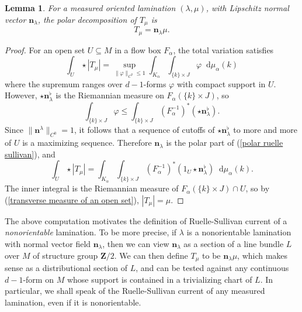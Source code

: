 \documentclass[reqno,11pt]{amsart}
\newcommand{\ZZ}{\mathbf{Z}}
\newcommand*\dif{\mathop{}\!\mathrm{d}}
\newcommand{\normal}{\mathbf n}
\newtheorem{lemma}[theorem]{Lemma}
\theoremstyle{definition}
\numberwithin{equation}{section}
\begin{document}
\begin{lemma}
For a measured oriented lamination $(\lambda, \mu)$, with Lipschitz normal vector $\normal_\lambda$, the polar decomposition of $T_\mu$ is
\begin{equation}\label{polar ruelle sullivan}
T_\mu = \normal_\lambda \mu.
\end{equation}
\end{lemma}
\begin{proof}
For an open set $U \subseteq M$ in a flow box $F_\alpha$, the total variation satisfies
$$\int_U \star |T_\mu| = \sup_{\|\varphi\|_{C^0} \leq 1} \int_{K_\alpha} \int_{\{k\} \times J} \varphi \dif \mu_\alpha(k)$$
where the supremum ranges over $d-1$-forms $\varphi$ with compact support in $U$.
However, $\star \normal_\lambda^\flat$ is the Riemannian measure on $F_\alpha(\{k\} \times J)$, so
$$\int_{\{k\} \times J} \varphi \leq \int_{\{k\} \times J} (F_\alpha^{-1})^*(\star \normal_\lambda^\flat).$$
Since $\|\normal^\lambda\|_{C^0} = 1$, it follows that a sequence of cutoffs of $\star \normal_\lambda^\flat$ to more and more of $U$ is a maximizing sequence.
Therefore $\normal_\lambda$ is the polar part of (\ref{polar ruelle sullivan}), and
$$\int_U \star |T_\mu| = \int_{K_\alpha} \int_{\{k\} \times J} (F_\alpha^{-1})^*(1_U \star \normal_\lambda^\flat) \dif \mu_\alpha(k).$$
The inner integral is the Riemannian measure of $F_\alpha(\{k\} \times J) \cap U$, so by (\ref{transverse measure of an open set}), $|T_\mu| = \mu$.
\end{proof}

The above computation motivates the definition of Ruelle-Sullivan current of a \emph{nonorientable} lamination.
To be more precise, if $\lambda$ is a nonorientable lamination with normal vector field $\normal_\lambda$, then we can view $\normal_\lambda$ as a section of a line bundle $L$ over $M$ of structure group $\ZZ/2$.
We can then define $T_\mu$ to be $\normal_\lambda \mu$, which makes sense as a distributional section of $L$, and can be tested against any continuous $d-1$-form on $M$ whose support is contained in a trivializing chart of $L$.
In particular, we shall speak of the Ruelle-Sullivan current of any measured lamination, even if it is nonorientable.
\end{document}
